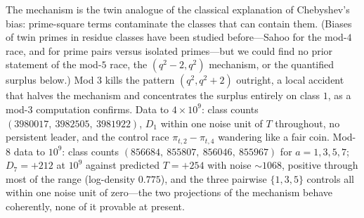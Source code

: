 \documentclass[11pt]{article}
\theoremstyle{definition}
\begin{document}
The mechanism is the twin analogue of the classical explanation of
Chebyshev's bias: prime-square terms contaminate the classes that can
contain them.  (Biases of twin primes in residue classes have been
studied before---Sahoo \cite{Sahoo} for the mod-$4$ race, and
\cite{PairBias} for prime pairs versus isolated primes---but we could
find no prior statement of the mod-$5$ race, the $(q^2-2,q^2)$
mechanism, or the quantified surplus below.)  Mod $3$ kills the pattern
$(q^2,q^2+2)$ outright, a local accident that halves the
mechanism and concentrates the surplus entirely on class $1$, as a
mod-$3$ computation confirms.  Data to $4\times10^9$:
class counts $(3980017,\ 3982505,\ 3981922)$, $D_1$ within one noise
unit of $T$ throughout, no persistent leader, and the
control race $\pi_{t,2}-\pi_{t,4}$ wandering like a fair coin.
Mod-8 data to $10^9$: class counts
$(856684,\ 855807,\ 856046,\ 855967)$ for $a=1,3,5,7$;
$D_7=+212$ at $10^9$ against predicted $T=+254$ with noise ${\sim}1068$,
positive through most of the range (log-density $0.775$), and the three
pairwise $\{1,3,5\}$ controls all within one noise unit of zero---the
two projections of the mechanism behave coherently, none of it provable
at present.
\end{document}
